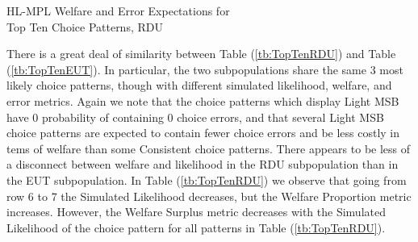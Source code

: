 \documentclass[../main.tex]{subfiles}
\begin{document}
\begin{table}[ht]
	\centering
	\caption{HL-MPL Welfare and Error Expectations for\\Top Ten Choice Patterns, RDU}
	\label{tb:TopTenRDU}
	\begin{adjustbox}{width=1\textwidth}
	\end{adjustbox}
\end{table}

There is a great deal of similarity between Table (\ref{tb:TopTenRDU}) and Table (\ref{tb:TopTenEUT}).
In particular, the two subpopulations share the same $3$ most likely choice patterns, though with different simulated likelihood, welfare, and error metrics.
Again we note that the choice patterns which display Light MSB have $0$ probability of containing $0$ choice errors, and that several Light MSB choice patterns are expected to contain fewer choice errors and be less costly in tems of welfare than some Consistent choice patterns.
There appears to be less of a disconnect between welfare and likelihood in the RDU subpopulation than in the EUT subpopulation. 
In Table (\ref{tb:TopTenRDU}) we observe that going from row 6 to 7 the Simulated Likelihood decreases, but the Welfare Proportion metric increases.
However, the Welfare Surplus metric decreases with the Simulated Likelihood of the choice pattern for all patterns in Table (\ref{tb:TopTenRDU}).
\end{document}

